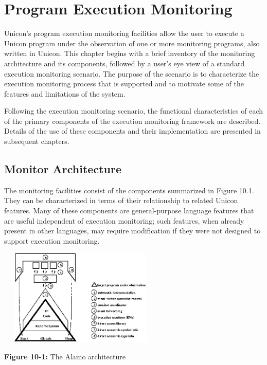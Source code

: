 \chapter{Program Execution Monitoring}

Unicon's program execution monitoring facilities allow the user to execute a
Unicon program under the observation of one or more monitoring programs,
also written in Unicon.  This chapter begins with a brief inventory of the
monitoring architecture and its components, followed by a user's eye view of
a standard execution monitoring scenario.  The purpose of the scenario is to
characterize the execution monitoring process that is supported and to
motivate some of the features and limitations of the system.

Following the execution monitoring scenario, the functional characteristics
of each of the primary components of the execution monitoring framework are
described.  Details of the use of these components and their implementation
are presented in subsequent chapters.

\section{Monitor Architecture}

The monitoring facilities consist of the components summarized in Figure
10.1. They can be characterized in terms of their relationship to related
Unicon features.  Many of these components are general-purpose language
features that are useful independent of execution monitoring; such features,
when already present in other languages, may require modification if they
were not designed to support execution monitoring.

\begin{center}
\includegraphics[width=3.1in,height=1.8in]{alamarch.png}
\end{center}

{\sffamily\bfseries Figure 10-1:}
{\sffamily The Alamo architecture}

\bigskip

